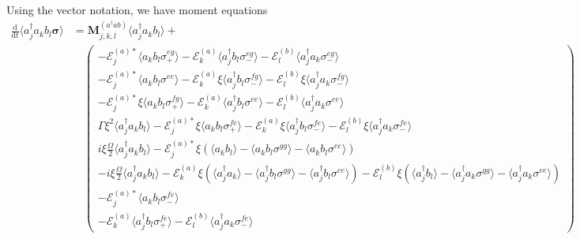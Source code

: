 \documentclass{article}
\newcommand{\ddt}[1][]{\frac{\mathrm{d} #1}{\mathrm{d}t}}
\begin{document}
Using the vector notation, we have moment equations
\begin{subequations}
	\begin{align}
		\ddt \langle a^{\dagger}_{j} a_{k} b_{l} \bm{\sigma} \rangle &= \bm{M}_{j, k, l}^{(a^{\dagger} a b)} \langle a^{\dagger}_{j} a_{k} b_{l} \rangle + \nonumber \\
		&\quad
		\begin{pmatrix}
			-\mathcal{E}_{j}^{(a) *} \langle a_{k} b_{l} \sigma^{eg}_{+} \rangle - \mathcal{E}_{k}^{(a)} \langle a^{\dagger}_{j} b_{l} \sigma^{eg}_{-} \rangle - \mathcal{E}_{l}^{(b)} \langle a^{\dagger}_{j} a_{k} \sigma^{eg}_{-} \rangle \\
			-\mathcal{E}_{j}^{(a) *} \langle a_{k} b_{l} \sigma^{ee} \rangle - \mathcal{E}_{k}^{(a)} \xi \langle a^{\dagger}_{j} b_{l} \sigma^{fg}_{-} \rangle - \mathcal{E}_{l}^{(b)} \xi \langle a^{\dagger}_{j} a_{k} \sigma^{fg}_{-} \rangle \\
			-\mathcal{E}_{j}^{(a) *} \xi \langle a_{k} b_{l} \sigma^{fg}_{+} \rangle - \mathcal{E}_{k}^{(a)} \langle a^{\dagger}_{j} b_{l} \sigma^{ee} \rangle - \mathcal{E}_{l}^{(b)} \langle a^{\dagger}_{j} a_{k} \sigma^{ee} \rangle \\
			\Gamma \xi^{2} \langle a^{\dagger}_{j} a_{k} b_{l} \rangle - \mathcal{E}_{j}^{(a) *} \xi \langle a_{k} b_{l} \sigma^{fe}_{+} \rangle - \mathcal{E}_{k}^{(a)} \xi \langle a^{\dagger}_{j} b_{l} \sigma^{fe}_{-} \rangle - \mathcal{E}_{l}^{(b)} \xi \langle a^{\dagger}_{j} a_{k} \sigma^{fe}_{-} \rangle \\
			i \xi \frac{\Omega}{2} \langle a^{\dagger}_{j} a_{k} b_{l} \rangle - \mathcal{E}_{j}^{(a) *} \xi \left( \langle a_{k} b_{l} \rangle - \langle a_{k} b_{l} \sigma^{gg} \rangle - \langle a_{k} b_{l} \sigma^{ee} \rangle \right) \\
			-i \xi \frac{\Omega}{2} \langle a^{\dagger}_{j} a_{k} b_{l} \rangle - \mathcal{E}_{k}^{(a)} \xi \left( \langle a^{\dagger}_{j} a_{k} \rangle - \langle a^{\dagger}_{j} b_{l} \sigma^{gg} \rangle - \langle a^{\dagger}_{j} b_{l} \sigma^{ee} \rangle \right) - \mathcal{E}_{l}^{(b)} \xi \left( \langle a^{\dagger}_{j} b_{l} \rangle - \langle a^{\dagger}_{j} a_{k} \sigma^{gg} \rangle - \langle a^{\dagger}_{j} a_{k} \sigma^{ee} \rangle \right) \\
			-\mathcal{E}_{j}^{(a) *} \langle a_{k} b_{l} \sigma^{fe}_{-} \rangle \\
			-\mathcal{E}_{k}^{(a)} \langle a^{\dagger}_{j} b_{l} \sigma^{fe}_{+} \rangle - \mathcal{E}_{l}^{(b)} \langle a^{\dagger}_{j} a_{k} \sigma^{fe}_{-} \rangle

\end{pmatrix}
\end{align}
\end{subequations}
\end{document}
